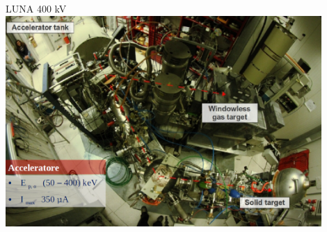 \documentclass [xcolor=svgnames] {beamer}
\begin{document}
%		

	
\begin{frame}{LUNA 400 kV}%
	\centering
	\includegraphics[width=0.9\textwidth]{img/LUNA2.png}
\end{frame}
\end{document}
